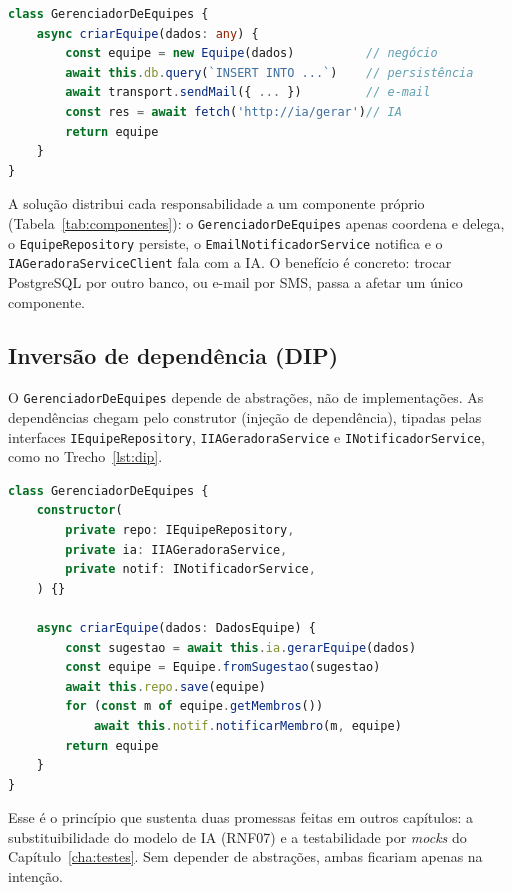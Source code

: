 \documentclass[a4paper,12pt,oneside,openany]{book}
\begin{document}
\needspace{5cm}
\begin{lstlisting}[language=TypeScript,caption={Antes: uma classe com quatro motivos para mudar.},label={lst:srp-antes}]
class GerenciadorDeEquipes {
    async criarEquipe(dados: any) {
        const equipe = new Equipe(dados)          // negócio
        await this.db.query(`INSERT INTO ...`)    // persistência
        await transport.sendMail({ ... })         // e-mail
        const res = await fetch('http://ia/gerar')// IA
        return equipe
    }
}
\end{lstlisting}

A solução distribui cada responsabilidade a um componente próprio
(Tabela~\ref{tab:componentes}): o \texttt{GerenciadorDeEquipes} apenas coordena e
delega, o \texttt{EquipeRepository} persiste, o \texttt{EmailNotificadorService}
notifica e o \texttt{IAGeradoraServiceClient} fala com a IA. O benefício é
concreto: trocar PostgreSQL por outro banco, ou e-mail por SMS, passa a afetar um
único componente.

\subsection{Inversão de dependência (DIP)}

O \texttt{GerenciadorDeEquipes} depende de abstrações, não de implementações. As
dependências chegam pelo construtor (injeção de dependência), tipadas pelas
interfaces \texttt{IEquipeRepository}, \texttt{IIAGeradoraService} e
\texttt{INotificadorService}, como no Trecho~\ref{lst:dip}.

\needspace{8cm}
\begin{lstlisting}[language=TypeScript,caption={Depois: negócio dependendo de abstrações.},label={lst:dip}]
class GerenciadorDeEquipes {
    constructor(
        private repo: IEquipeRepository,
        private ia: IIAGeradoraService,
        private notif: INotificadorService,
    ) {}

    async criarEquipe(dados: DadosEquipe) {
        const sugestao = await this.ia.gerarEquipe(dados)
        const equipe = Equipe.fromSugestao(sugestao)
        await this.repo.save(equipe)
        for (const m of equipe.getMembros())
            await this.notif.notificarMembro(m, equipe)
        return equipe
    }
}
\end{lstlisting}

Esse é o princípio que sustenta duas promessas feitas em outros capítulos: a
substituibilidade do modelo de IA (RNF07) e a testabilidade por \textit{mocks} do
Capítulo~\ref{cha:testes}. Sem depender de abstrações, ambas ficariam apenas na
intenção.
\end{document}

